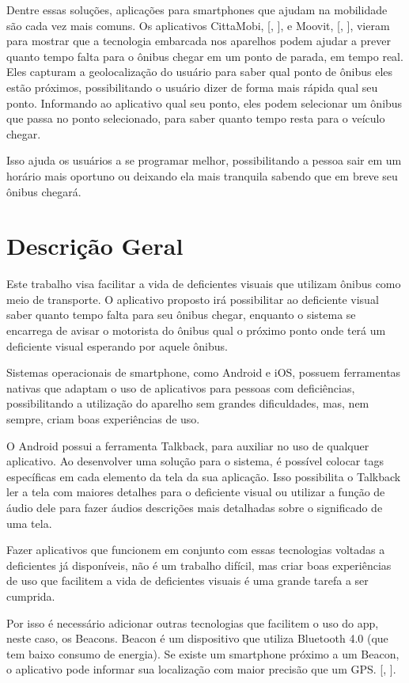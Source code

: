 \documentclass[
	12pt,				%
	oneside,			%
	a4paper,			%
	brazil				%
]{abntex2}
\newcommand{\citecustom}[1]{[\citeauthoronline{#1}, \citeyear{#1}]}
\begin{document}
	Dentre essas soluções, aplicações para smartphones que ajudam na mobilidade são cada vez mais comuns. Os aplicativos CittaMobi, \citecustom{Vieira2015}, e Moovit, \citecustom{Gomes2015}, vieram para mostrar que a tecnologia embarcada nos aparelhos podem ajudar a prever quanto tempo falta para o ônibus chegar em um ponto de parada, em tempo real. Eles capturam a geolocalização do usuário para saber qual ponto de ônibus eles estão próximos, possibilitando o usuário dizer de forma mais rápida qual seu ponto. Informando ao aplicativo qual seu ponto, eles podem selecionar um ônibus que passa no ponto selecionado, para saber quanto tempo resta para o veículo chegar.

Isso ajuda os usuários a se programar melhor, possibilitando a pessoa sair em um horário mais oportuno ou deixando ela mais tranquila sabendo que em breve seu ônibus chegará.

\section{Descrição Geral}

Este trabalho visa facilitar a vida de deficientes visuais que utilizam ônibus como meio de transporte. O aplicativo proposto irá possibilitar ao deficiente visual saber quanto tempo falta para seu ônibus chegar, enquanto o sistema se encarrega de avisar o motorista do ônibus qual o próximo ponto onde terá um deficiente visual esperando por aquele ônibus.

Sistemas operacionais de smartphone, como Android e iOS, possuem ferramentas nativas que adaptam o uso de aplicativos para pessoas com deficiências, possibilitando a utilização do aparelho sem grandes dificuldades, mas, nem sempre, criam boas experiências de uso. 

O Android possui a ferramenta Talkback, para auxiliar no uso de qualquer aplicativo. Ao desenvolver uma solução para o sistema, é possível colocar tags específicas em cada elemento da tela da sua aplicação. Isso possibilita o Talkback ler a tela com maiores detalhes para o deficiente visual ou utilizar a função de áudio dele para fazer áudios descrições mais detalhadas sobre o significado de uma tela.

Fazer aplicativos que funcionem em conjunto com essas tecnologias voltadas a deficientes já disponíveis, não é um trabalho difícil, mas criar boas experiências de uso que facilitem a vida de deficientes visuais é uma grande tarefa a ser cumprida.

Por isso é necessário adicionar outras tecnologias que facilitem o uso do app, neste caso, os Beacons. Beacon é um dispositivo que utiliza Bluetooth 4.0 (que tem baixo consumo de energia). Se existe um smartphone próximo a um Beacon, o aplicativo pode informar sua localização com maior precisão que um GPS. \citecustom{beacon}.
\end{document}

